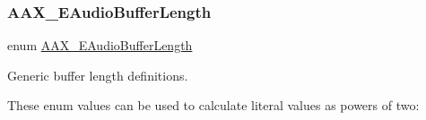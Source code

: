 \subsubsection{\texorpdfstring{AAX\_EAudioBufferLength}{AAX\_EAudioBufferLength}}
{\footnotesize\ttfamily enum \mbox{\hyperlink{a00491_ada5e011bdfdc6a996de752662b3dfbe7}{A\+A\+X\+\_\+\+E\+Audio\+Buffer\+Length}}}



Generic buffer length definitions. 

These enum values can be used to calculate literal values as powers of two\+:


\begin{DoxyCode}{0}
\end{DoxyCode}


